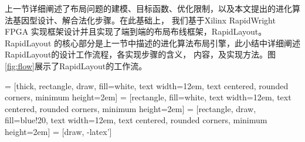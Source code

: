 上一节详细阐述了布局问题的建模、目标函数、优化限制，以及本文提出的进化算法基因型设计、解合法化步骤。在此基础上，
我们基于Xilinx RapidWright FPGA 实现框架设计并且实现了端到端的布局布线框架，RapidLayout。RapidLayout
的核心部分是上一节中描述的进化算法布局引擎，此小结中详细阐述RapidLayout的设计工作流程，各实现步骤的含义，
内容，及实现方法。图\ref{fig:flow}展示了RapidLayout的工作流。



 = [thick, rectangle, draw, fill=white, text width=12em, text centered, rounded corners, minimum height=2em]
 = [rectangle, fill=white, text width=12em, text centered, rounded corners, minimum height=2em]
 = [rectangle, draw, fill=blue!20, text width=12em, text centered, rounded corners, minimum height=2em]
 = [draw, -latex']




